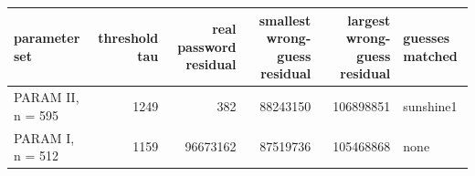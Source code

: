 \begin{tabular}{lrrrrl}
\toprule
\textbf{parameter set} & \textbf{threshold tau} & \textbf{real password residual} & \textbf{smallest wrong-guess residual} & \textbf{largest wrong-guess residual} & \textbf{guesses matched} \\
\midrule
PARAM II, n = 595 & 1249 & 382 & 88243150 & 106898851 & sunshine1 \\
PARAM I, n = 512 & 1159 & 96673162 & 87519736 & 105468868 & none \\
\bottomrule
\end{tabular}
